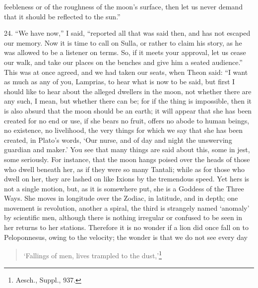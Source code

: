 \documentclass[a4paper, 11pt, oneside, polutonikogreek, english]{article}
\begin{document}
feebleness or of the roughness of the moon's surface, then let us never demand that it should be reflected to the sun.''

24. ``We have now,'' I said, ``reported all that was said then, and has not escaped our memory. Now it is time to call on Sulla, or rather to claim his story, as he was allowed to be a listener on terms. So, if it meets your approval, let us cease our walk, and take our places on the benches and give him a seated audience.'' This was at once agreed, and we had taken our seats, when Theon said: ``I want as much as any of you, Lamprias, to hear what is now to be said, but first I should like to hear about the alleged dwellers in the moon, not whether there are any such, I mean, but whether there can be; for if the thing is impossible, then it is also absurd that the moon should be an earth; it will appear that she has been created for no end or use, if she bears no fruit, offers no abode to human beings, no existence, no livelihood, the very things for which we say that she has been created, in Plato's words, `Our nurse, and of day and night the unswerving guardian and maker.' You see that many things are said about this, some in jest, some seriously. For instance, that the moon hangs poised over the heads of those who dwell beneath her, as if they were so many Tantali; while as for those who dwell on her, they are lashed on like Ixions by the tremendous speed. Yet hers is not a single motion, but, as it is somewhere put, she is a Goddess of the Three Ways. She moves in longitude over the Zodiac, in latitude, and in depth; one movement is revolution, another a spiral, the third is strangely named `anomaly' by scientific men, although there is nothing irregular or confused to be seen in her returns to her stations. Therefore it is no wonder if a lion did once fall on to Peloponnesus, owing to the velocity; the wonder is that we do not see every day
\begin{quotation}
`Fallings of men, lives trampled to the dust,'\footnote{Aesch., Suppl., 937.}
\end{quotation}
\end{document}

